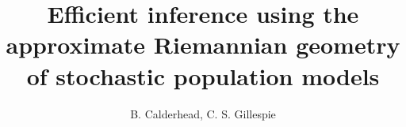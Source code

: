 \documentclass{pnastwo}
\begin{document}



\title{Efficient inference using the approximate Riemannian geometry of stochastic population models}






\author{B. Calderhead, C. S. Gillespie}

\maketitle
\end{document}
